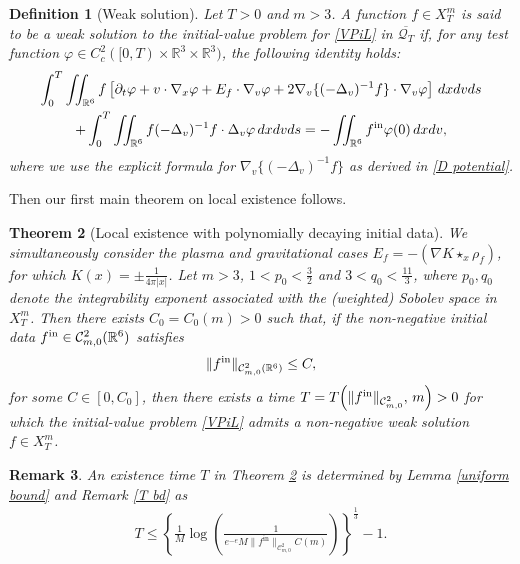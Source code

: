 \documentclass[reqno,11pt,final]{amsart}
\theoremstyle{plain}
\newtheorem{theorem}{Theorem}
\newtheorem{definition}[theorem]{Definition}
\newtheorem{remark}[theorem]{Remark}
\numberwithin{equation}{section}
\numberwithin{theorem}{section}
\begin{document}
\begin{definition}[Weak solution]\label{Weak formulation}
    Let $T>0$ and $m>3$. A function $f\in X_T^m$ is said to be a weak solution to the initial-value problem for \eqref{VPiL} in $\overline{\mathcal{Q}_T}$ if, for any test function $\varphi\in C_c^2([0,T)\times\mathbb{R}^3\times\mathbb{R}^3)$, the following identity holds:
\begin{multline}\label{weak formulation}
\int_0^T \iint_{\mathbb{R}^6} f\left[\partial_t\varphi + v\cdot\nabla_x\varphi + E_f \cdot\nabla_v\varphi + 2\nabla_v\{(-\Delta_v)^{-1}f\}\cdot\nabla_v\varphi\right] \,dxdvds\\
+ \int_0^T\iint_{\mathbb{R}^6}f(-\Delta_v)^{-1}f\cdot \Delta_v\varphi\,dxdvds
=-\iint_{\mathbb{R}^6}f^\textup{in} \varphi(0)\,dxdv,
\end{multline}where we use the explicit formula for $\nabla_v\{(-\Delta_v)^{-1}f\}$ as derived in \eqref{D potential}.
\end{definition}

Then our first main theorem on local existence follows.

\begin{theorem}[Local existence with polynomially decaying initial data]\label{thm.main1}
     We simultaneously consider the plasma and gravitational cases $E_f = -(\nabla K\star_x\rho_f)$, for which $K(x)=\pm\frac{1}{4\pi|x|}$. Let $m>3$, $1<p_0<\frac{3}{2}$ and $3<q_0<\frac{11}{3}$, where $p_0,q_0$ denote the integrability exponent associated with the (weighted) Sobolev space in $X_T^m$. Then there exists $C_0 = C_0(m) > 0$ such that, if the non-negative initial data 
$f^\textup{in} \in  \mathcal{C}^2_{m,0}(\mathbb{R}^6)$ satisfies
\begin{align}\label{smallness cond initial}
    \|f^\textup{in}\|_{\mathcal{C}^2_{m,0}(\mathbb{R}^6)} \le C,
\end{align}
for some $C \in [0,C_0]$, then there exists a time 
$T = T\!\left(\|f^\textup{in}\|_{\mathcal{C}^2_{m,0}},\, m\right) > 0$
for which the initial-value problem \eqref{VPiL} admits a non-negative weak solution $f \in X_T^m$.
\end{theorem}
\begin{remark}\label{thm.main1 maximal existence time}
    An existence time $T$ in Theorem \ref{thm.main1} is determined by Lemma \ref{uniform bound} and Remark \ref{T bd} as 
    \begin{align*}
    T \le 
    \left\{
        \frac{1}{M}
        \log\!\left(
            \frac{1}{
                e^{-e}M
                \|f^{\mathrm{in}}\|_{\mathcal{C}^2_{m,0}}C(m)
            }
        \right)
    \right\}^{\!\frac{1}{3}}
    - 1.
\end{align*}
\end{remark}
\end{document}
